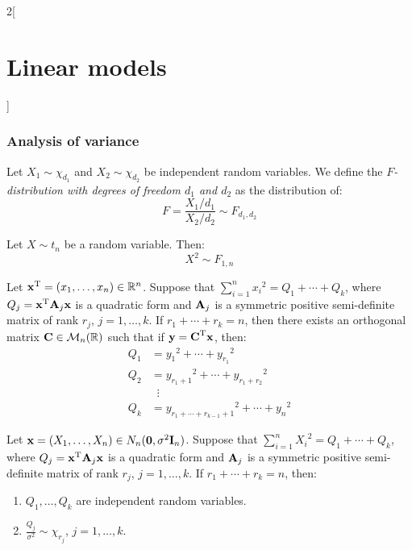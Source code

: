 \documentclass[../../../main_math.tex]{subfiles}
\begin{document}
\begin{multicols}{2}[\section{Linear models}]
  \subsubsection{Analysis of variance}
  \begin{definition}
    Let $X_1\sim{\chi_{d_1}}$ and $X_2\sim{\chi_{d_2}}$ be independent random variables. We define the \emph{$F$-distribution with degrees of freedom $d_1$ and $d_2$} as the distribution of: $$F=\frac{X_1/d_1}{X_2/d_2}\sim F_{d_1, d_2}$$
  \end{definition}
  \begin{proposition}\label{LM:tF}
    Let $X\sim t_n$ be a random variable. Then: $$X^2\sim F_{1,n}$$
  \end{proposition}
  \begin{lemma}
    Let ${\boldsymbol{\mathrm{x}}}^{\mathrm{T}}=(x_1,\ldots,x_n)\in\mathbb{R}^n$. Suppose that $\sum_{i=1}^n {x_i}^2=Q_1+\cdots+Q_k$, where $Q_j={\boldsymbol{\mathrm{x}}}^{\mathrm{T}}\boldsymbol{\mathrm{A}}_j\boldsymbol{\mathrm{x}}$ is a quadratic form and $\boldsymbol{\mathrm{A}}_j$ is a symmetric positive semi-definite matrix of rank $r_j$, $j=1,\ldots,k$. If $r_1+\cdots+r_k=n$, then there exists an orthogonal matrix $\boldsymbol{\mathrm{C}}\in\mathcal{M}_n(\mathbb{R})$ such that if $\boldsymbol{\mathrm{y}}={\boldsymbol{\mathrm{C}}}^{\mathrm{T}}\boldsymbol{\mathrm{x}}$, then:
    \begin{equation*}
      \begin{aligned}
        Q_1 & = {y_1}^2+\cdots+{y_{r_1}}^2                    \\
        Q_2 & = {y_{r_1+1}}^2+\cdots+{y_{r_1+r_2}}^2          \\
            & \;\;\vdots                                      \\
        Q_k & = {y_{r_1+\cdots+r_{k-1}+1}}^2+\cdots+{y_{n}}^2
      \end{aligned}
    \end{equation*}
  \end{lemma}
  \begin{theorem}
    Let $\boldsymbol{\mathrm{x}}=(X_1,\ldots,X_n)\in N_n(\boldsymbol{\mathrm{0}},\sigma^2\boldsymbol{\mathrm{I}}_n)$. Suppose that $\sum_{i=1}^n {X_i}^2=Q_1+\cdots+Q_k$, where $Q_j={\boldsymbol{\mathrm{x}}}^{\mathrm{T}}\boldsymbol{\mathrm{A}}_j\boldsymbol{\mathrm{x}}$ is a quadratic form and $\boldsymbol{\mathrm{A}}_j$ is a symmetric positive semi-definite matrix of rank $r_j$, $j=1,\ldots,k$. If $r_1+\cdots+r_k=n$, then:
    \begin{enumerate}
      \item $Q_1,\ldots,Q_k$ are independent random variables.
      \item $\frac{Q_j}{\sigma^2}\sim{\chi_{r_j}}$, $j=1,\ldots,k$.
    \end{enumerate}
  \end{theorem}

\end{multicols}
\end{document}
